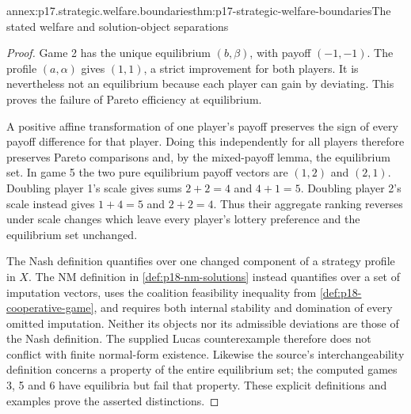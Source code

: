 \begin{annexitem}{annex:p17.strategic.welfare.boundaries}{thm:p17-strategic-welfare-boundaries}{The stated welfare and solution-object separations}
\begin{proof}
Game 2 has the unique equilibrium
\((b,\beta)\), with payoff \((-1,-1)\).
The profile \((a,\alpha)\) gives
\((1,1)\), a strict improvement
for both players. It is nevertheless
not an equilibrium because each
player can gain by deviating.
This proves the failure of Pareto
efficiency at equilibrium.

A positive affine transformation of
one player's payoff preserves the
sign of every payoff difference
for that player. Doing this
independently for all players
therefore preserves Pareto comparisons
and, by the mixed-payoff lemma,
the equilibrium set.
In game 5 the two pure equilibrium
payoff vectors are \((1,2)\)
and \((2,1)\). Doubling player 1's
scale gives sums \(2+2=4\)
and \(4+1=5\). Doubling player 2's
scale instead gives \(1+4=5\)
and \(2+2=4\). Thus their aggregate
ranking reverses under scale changes
which leave every player's lottery
preference and the equilibrium
set unchanged.

The Nash definition quantifies over
one changed component of a strategy
profile in \(X\).
The NM definition in
\cref{def:p18-nm-solutions} instead
quantifies over a set of imputation
vectors, uses the coalition feasibility
inequality from
\cref{def:p18-cooperative-game},
and requires both internal stability
and domination of every omitted
imputation. Neither its objects nor
its admissible deviations are those
of the Nash definition.
The supplied Lucas counterexample
therefore does not conflict with
finite normal-form existence.
Likewise the source's interchangeability
definition concerns a property of
the entire equilibrium set; the
computed games 3, 5 and 6 have
equilibria but fail that property.
These explicit definitions and
examples prove the asserted
distinctions.
\end{proof}
\end{annexitem}

